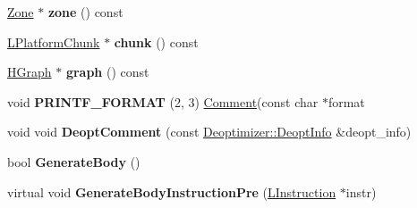 \begin{DoxyCompactItemize}
\item 
\hyperlink{classv8_1_1internal_1_1_zone}{Zone} $\ast$ {\bfseries zone} () const \hypertarget{classv8_1_1internal_1_1_b_a_s_e___e_m_b_e_d_d_e_d_a52fc0e306aa3628bf7e2d0c397a1f5c6}{}\label{classv8_1_1internal_1_1_b_a_s_e___e_m_b_e_d_d_e_d_a52fc0e306aa3628bf7e2d0c397a1f5c6}

\item 
\hyperlink{classv8_1_1internal_1_1_l_platform_chunk}{L\+Platform\+Chunk} $\ast$ {\bfseries chunk} () const \hypertarget{classv8_1_1internal_1_1_b_a_s_e___e_m_b_e_d_d_e_d_a5ad71a5061accec334446e13a5f58727}{}\label{classv8_1_1internal_1_1_b_a_s_e___e_m_b_e_d_d_e_d_a5ad71a5061accec334446e13a5f58727}

\item 
\hyperlink{classv8_1_1internal_1_1_h_graph}{H\+Graph} $\ast$ {\bfseries graph} () const \hypertarget{classv8_1_1internal_1_1_b_a_s_e___e_m_b_e_d_d_e_d_a020418e5b56272d58e8a93da1def9c59}{}\label{classv8_1_1internal_1_1_b_a_s_e___e_m_b_e_d_d_e_d_a020418e5b56272d58e8a93da1def9c59}

\item 
void {\bfseries P\+R\+I\+N\+T\+F\+\_\+\+F\+O\+R\+M\+AT} (2, 3) \hyperlink{classv8_1_1internal_1_1_comment}{Comment}(const char $\ast$format\hypertarget{classv8_1_1internal_1_1_b_a_s_e___e_m_b_e_d_d_e_d_aac21414b7fa2d856d29d41835c2c569f}{}\label{classv8_1_1internal_1_1_b_a_s_e___e_m_b_e_d_d_e_d_aac21414b7fa2d856d29d41835c2c569f}

\item 
void void {\bfseries Deopt\+Comment} (const \hyperlink{structv8_1_1internal_1_1_deoptimizer_1_1_deopt_info}{Deoptimizer\+::\+Deopt\+Info} \&deopt\+\_\+info)\hypertarget{classv8_1_1internal_1_1_b_a_s_e___e_m_b_e_d_d_e_d_afa2424980c4e4d65eee56de817075f53}{}\label{classv8_1_1internal_1_1_b_a_s_e___e_m_b_e_d_d_e_d_afa2424980c4e4d65eee56de817075f53}

\item 
bool {\bfseries Generate\+Body} ()\hypertarget{classv8_1_1internal_1_1_b_a_s_e___e_m_b_e_d_d_e_d_a11406fadd6c21d3aaa1ca8f084860090}{}\label{classv8_1_1internal_1_1_b_a_s_e___e_m_b_e_d_d_e_d_a11406fadd6c21d3aaa1ca8f084860090}

\item 
virtual void {\bfseries Generate\+Body\+Instruction\+Pre} (\hyperlink{classv8_1_1internal_1_1_l_instruction}{L\+Instruction} $\ast$instr)\hypertarget{classv8_1_1internal_1_1_b_a_s_e___e_m_b_e_d_d_e_d_aee73340520b542d0f3e12a859f621cf9}{}\label{classv8_1_1internal_1_1_b_a_s_e___e_m_b_e_d_d_e_d_aee73340520b542d0f3e12a859f621cf9}


\end{DoxyCompactItemize}
